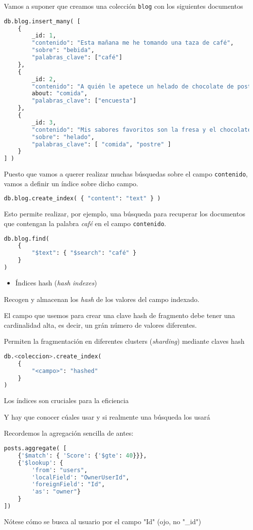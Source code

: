 Vamos a suponer que creamos una colección \texttt{blog} con los siguientes documentos

\begin{lstlisting}[language=python]
db.blog.insert_many( [ 
	{
		_id: 1,
		"contenido": "Esta mañana me he tomando una taza de café",
		"sobre": "bebida",
		"palabras_clave": ["café"]
	},
	{
		_id: 2,
		"contenido": "A quién le apetece un helado de chocolate de postre?",
		about: "comida",
		"palabras_clave": ["encuesta"]
	},
	{
		_id: 3,
		"contenido": "Mis sabores favoritos son la fresa y el chocolate",
		"sobre": "helado",
		"palabras_clave": [ "comida", "postre" ]
	}
] )
\end{lstlisting}
Puesto que vamos a querer realizar muchas búsquedas sobre el campo \texttt{contenido}, vamos a definir un índice sobre dicho campo.
\begin{lstlisting}[language=python]
db.blog.create_index( { "content": "text" } )
\end{lstlisting}

Esto permite realizar, por ejemplo, una búsqueda para recuperar los documentos que contengan la palabra \textit{café} en el campo \texttt{contenido}.
\begin{lstlisting}[language=python]
db.blog.find(
	{
		"$text": { "$search": "café" }
	}
)
\end{lstlisting}
\begin{itemize}[label=\color{red}\textbullet, leftmargin=*]
	\item \color{lightblue}Índices hash (\textit{hash indexes})
\end{itemize}
Recogen y almacenan los \textit{hash} de los valores del campo indexado.

El campo que usemos para crear una clave hash de fragmento debe tener una cardinalidad alta, es decir, un grán número de valores diferentes.

Permiten la fragmentación en diferentes clusters (\textit{sharding}) mediante claves hash
\begin{lstlisting}[language=python]
db.<coleccion>.create_index(
	{
		"<campo>": "hashed"	
	}
)
\end{lstlisting}
Los índices son cruciales para la eficiencia

Y hay que conocer cúales usar y si realmente una búsqueda los usará

Recordemos la agregación sencilla de antes:
\begin{lstlisting}[language=python]
posts.aggregate( [
	{'$match': { 'Score': {'$gte': 40}}},
	{'$lookup': {
		'from': "users",
		'localField': "OwnerUserId",
		'foreignField': "Id",
		'as': "owner"}	
	}
])
\end{lstlisting}
Nótese cómo se busca al usuario por el campo "Id" (ojo, no "_id")

